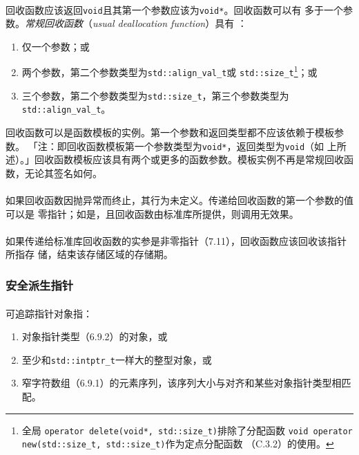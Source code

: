 \paragraph{}
回收函数应该返回\texttt{void}且其第一个参数应该为\texttt{void*}。回收函数可以有
多于一个参数。\textit{常规回收函数}（\textit{usual deallocation function}）具有
：
\begin{enumerate}
  \item{仅一个参数；或}
  \item{两个参数，第二个参数类型为\texttt{std::align\_val\_t}或
      \texttt{std::size\_t}\footnote{全局
      \texttt{operator delete(void*, std::size\_t)}排除了分配函数
      \texttt{void operator new(std::size\_t, std::size\_t)}作为定点分配函数
      （C.3.2）的使用。}；或}
  \item{三个参数，第二个参数类型为\texttt{std::size\_t}，第三个参数类型为
      \texttt{std::align\_val\_t}。}
\end{enumerate}
回收函数可以是函数模板的实例。第一个参数和返回类型都不应该依赖于模板参数。
「注：即回收函数模板第一个参数类型为\texttt{void*}，返回类型为\texttt{void}（如
上所述）。」回收函数模板应该具有两个或更多的函数参数。模板实例不再是常规回收函
数，无论其签名如何。

\paragraph{}
如果回收函数因抛异常而终止，其行为未定义。传递给回收函数的第一个参数的值可以是
零指针；如是，且回收函数由标准库所提供，则调用无效果。

\paragraph{}
如果传递给标准库回收函数的实参是非零指针（7.11），回收函数应该回收该指针所指存
储，结束该存储区域的存储期。

\subsubsection{安全派生指针}
\paragraph{}
可追踪指针对象指：
\begin{enumerate}
  \item{对象指针类型（6.9.2）的对象，或}
  \item{至少和\texttt{std::intptr\_t}一样大的整型对象，或}
  \item{窄字符数组（6.9.1）的元素序列，该序列大小与对齐和某些对象指针类型相匹
    配。}
\end{enumerate}

